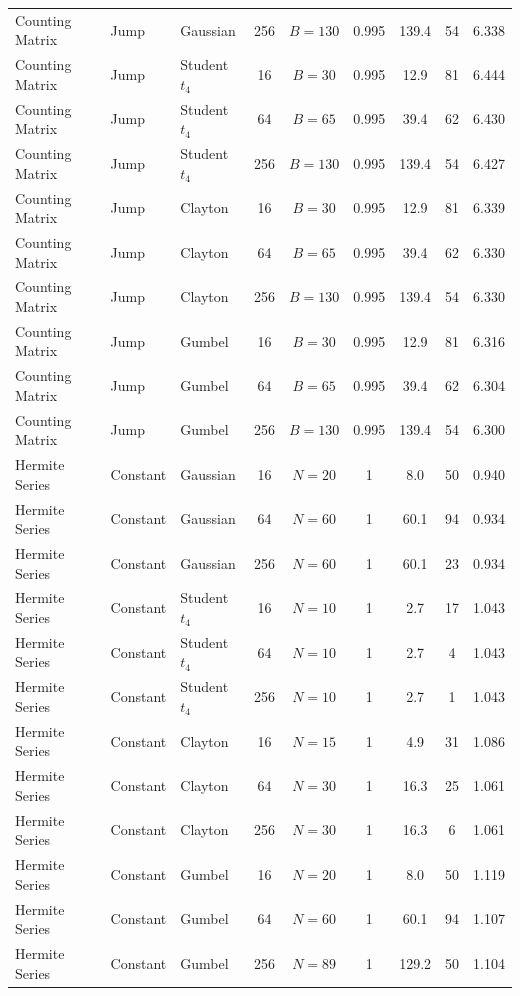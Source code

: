 \begin{longtable}{@{}lllcccccc@{}}
Counting Matrix & Jump & Gaussian & 256 & $B=130$ & 0.995 & 139.4 & 54 & 6.338 \\
Counting Matrix & Jump & Student $t_4$ & 16 & $B=30$ & 0.995 & 12.9 & 81 & 6.444 \\
Counting Matrix & Jump & Student $t_4$ & 64 & $B=65$ & 0.995 & 39.4 & 62 & 6.430 \\
Counting Matrix & Jump & Student $t_4$ & 256 & $B=130$ & 0.995 & 139.4 & 54 & 6.427 \\
Counting Matrix & Jump & Clayton & 16 & $B=30$ & 0.995 & 12.9 & 81 & 6.339 \\
Counting Matrix & Jump & Clayton & 64 & $B=65$ & 0.995 & 39.4 & 62 & 6.330 \\
Counting Matrix & Jump & Clayton & 256 & $B=130$ & 0.995 & 139.4 & 54 & 6.330 \\
Counting Matrix & Jump & Gumbel & 16 & $B=30$ & 0.995 & 12.9 & 81 & 6.316 \\
Counting Matrix & Jump & Gumbel & 64 & $B=65$ & 0.995 & 39.4 & 62 & 6.304 \\
Counting Matrix & Jump & Gumbel & 256 & $B=130$ & 0.995 & 139.4 & 54 & 6.300 \\
\addlinespace
Hermite Series & Constant & Gaussian & 16 & $N=20$ & 1 & 8.0 & 50 & 0.940 \\
Hermite Series & Constant & Gaussian & 64 & $N=60$ & 1 & 60.1 & 94 & 0.934 \\
Hermite Series & Constant & Gaussian & 256 & $N=60$ & 1 & 60.1 & 23 & 0.934 \\
Hermite Series & Constant & Student $t_4$ & 16 & $N=10$ & 1 & 2.7 & 17 & 1.043 \\
Hermite Series & Constant & Student $t_4$ & 64 & $N=10$ & 1 & 2.7 & 4 & 1.043 \\
Hermite Series & Constant & Student $t_4$ & 256 & $N=10$ & 1 & 2.7 & 1 & 1.043 \\
Hermite Series & Constant & Clayton & 16 & $N=15$ & 1 & 4.9 & 31 & 1.086 \\
Hermite Series & Constant & Clayton & 64 & $N=30$ & 1 & 16.3 & 25 & 1.061 \\
Hermite Series & Constant & Clayton & 256 & $N=30$ & 1 & 16.3 & 6 & 1.061 \\
Hermite Series & Constant & Gumbel & 16 & $N=20$ & 1 & 8.0 & 50 & 1.119 \\
Hermite Series & Constant & Gumbel & 64 & $N=60$ & 1 & 60.1 & 94 & 1.107 \\
Hermite Series & Constant & Gumbel & 256 & $N=89$ & 1 & 129.2 & 50 & 1.104 \\

\end{longtable}
